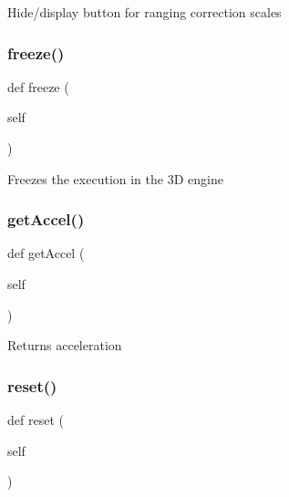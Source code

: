\begin{DoxyVerb}Hide/display button for ranging correction scales\end{DoxyVerb}
 \mbox{\label{class_menu_1_1_menu_a27ecebb6378a0b8dd1580f5fd1ba5c76}} 
\subsubsection{\texorpdfstring{freeze()}{freeze()}}
{\footnotesize\ttfamily def freeze (\begin{DoxyParamCaption}\item[{}]{self }\end{DoxyParamCaption})}

\begin{DoxyVerb}Freezes the execution in the 3D engine\end{DoxyVerb}
 \mbox{\label{class_menu_1_1_menu_aabea3c091001d3cfad62483ffa367db8}} 
\subsubsection{\texorpdfstring{get\+Accel()}{getAccel()}}
{\footnotesize\ttfamily def get\+Accel (\begin{DoxyParamCaption}\item[{}]{self }\end{DoxyParamCaption})}

\begin{DoxyVerb}Returns acceleration\end{DoxyVerb}
 \mbox{\label{class_menu_1_1_menu_a51829b63adb24ac48d350dee60181002}} 
\subsubsection{\texorpdfstring{reset()}{reset()}}
{\footnotesize\ttfamily def reset (\begin{DoxyParamCaption}\item[{}]{self }\end{DoxyParamCaption})}

